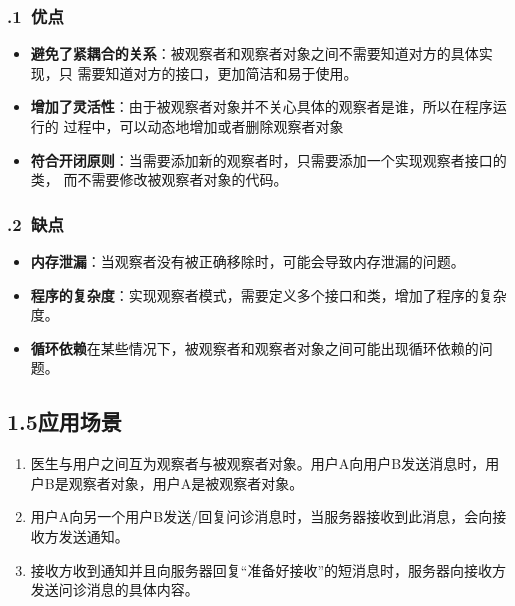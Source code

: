 \documentclass[24pt,a4paper]{article}%
\begin{document}
\subsubsection*{.1\ 优点}
\begin{itemize}
    \item \textbf{避免了紧耦合的关系}：被观察者和观察者对象之间不需要知道对方的具体实现，只
    需要知道对方的接口，更加简洁和易于使用。
    \item \textbf{增加了灵活性}：由于被观察者对象并不关心具体的观察者是谁，所以在程序运行的
    过程中，可以动态地增加或者删除观察者对象
    \item \textbf{符合开闭原则}：当需要添加新的观察者时，只需要添加一个实现观察者接口的类，
    而不需要修改被观察者对象的代码。
\end{itemize}

\subsubsection*{.2\ 缺点}
\begin{itemize}
    \item \textbf{内存泄漏}：当观察者没有被正确移除时，可能会导致内存泄漏的问题。
    \item \textbf{程序的复杂度}：实现观察者模式，需要定义多个接口和类，增加了程序的复杂度。
    \item \textbf{循环依赖}在某些情况下，被观察者和观察者对象之间可能出现循环依赖的问题。
\end{itemize}

\subsection*{\songti 1.5应用场景}
\begin{enumerate}
    \item 医生与用户之间互为观察者与被观察者对象。用户A向用户B发送消息时，用户B是观察者对象，用户A是被观察者对象。
    \item 用户A向另一个用户B发送/回复问诊消息时，当服务器接收到此消息，会向接收方发送通知。
    \item 接收方收到通知并且向服务器回复“准备好接收”的短消息时，服务器向接收方发送问诊消息的具体内容。
\end{enumerate}
\end{document}
